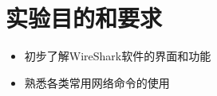 
\section{实验目的和要求}

\begin{itemize}
    \item 初步了解WireShark软件的界面和功能
    \item 熟悉各类常用网络命令的使用
\end{itemize}
